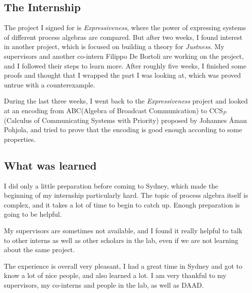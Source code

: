 \documentclass[adraft]{eptcs}
\begin{document}
\subsection{The Internship}
The project I signed for is \emph{Expressiveness}, where the power of expressing systems of different process algebras are compared. But after two weeks, I found interest in another project, which is focused on building a theory for \emph{Justness}. My supervisors and another co-intern Filippo De Bortoli are working on the project, and I followed their steps to learn more. After roughly five weeks, I finished some proofs and thought that I wrapped the part I was looking at, which was proved untrue with a counterexample. 

During the last three weeks, I went back to the \emph{Expressiveness} project and looked at an encoding from ABC(Algebra of Broadcast Communication) to CCS$_P$ (Calculus of Communicating Systems with Priority) proposed by Johannes \AA man Pohjola, and tried to prove that the encoding is good enough according to some properties. 

\subsection{What was learned}
I did only a little preparation before coming to Sydney, which made the beginning of my internship particularly hard. The topic of process algebra itself is complex, and it takes a lot of time to begin to catch up. Enough preparation is going to be helpful. 

My supervisors are sometimes not available, and I found it really helpful to talk to other interns as well as other scholars in the lab, even if we are not learning about the same project. 

The experience is overall very pleasant, I had a great time in Sydney and got to know a lot of nice people, and also learned a lot. I am very thankful to my supervisors, my co-interns and people in the lab, as well as DAAD. 
\end{document}

